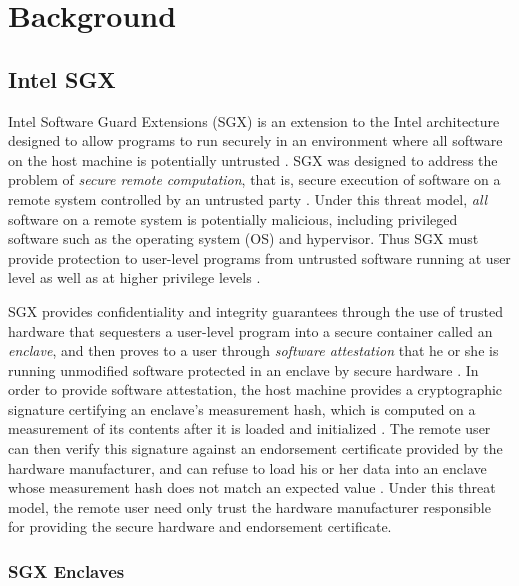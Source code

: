 \section{Background}

\subsection{Intel SGX}

Intel Software Guard Extensions (SGX) is an extension to the Intel architecture designed to allow programs to run securely in an environment where all software on the host machine is potentially untrusted \cite{intel_corporation_intel_2016}. SGX was designed to address the problem of \emph{secure remote computation}, that is, secure execution of software on a remote system controlled by an untrusted party \cite{intel_corporation_intel_2016}. Under this threat model, \emph{all} software on a remote system is potentially malicious, including privileged software such as the operating system (OS) and hypervisor. Thus SGX must provide protection to user-level programs from untrusted software running at user level as well as at higher privilege levels \cite{costan_intel_2016}. 

SGX provides confidentiality and integrity guarantees through the use of trusted hardware that sequesters a user-level program into a secure container called an \emph{enclave}, and then proves to a user through \emph{software attestation} that he or she is running unmodified software protected in an enclave by secure hardware \cite{intel_corporation_intel_2016}. In order to provide software attestation, the host machine provides a cryptographic signature certifying an enclave's measurement hash, which is computed on a measurement of its contents after it is loaded and initialized \cite{costan_intel_2016}. The remote user can then verify this signature against an endorsement certificate provided by the hardware manufacturer, and can refuse to load his or her data into an enclave whose measurement hash does not match an expected value \cite{intel_corporation_intel_2016, costan_intel_2016}. Under this threat model, the remote user need only trust the hardware manufacturer responsible for providing the secure hardware and endorsement certificate.

\subsubsection{SGX Enclaves}

